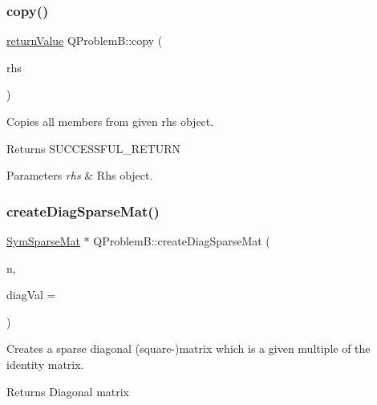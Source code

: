 \subsubsection{\texorpdfstring{copy()}{copy()}}
{\footnotesize\ttfamily \hyperlink{_message_handling_8hpp_a81d556f613bfbabd0b1f9488c0fa865e}{return\+Value} Q\+Problem\+B\+::copy (\begin{DoxyParamCaption}\item[{const \hyperlink{class_q_problem_b}{Q\+ProblemB} \&}]{rhs }\end{DoxyParamCaption})\hspace{0.3cm}{\ttfamily [protected]}}

Copies all members from given rhs object. \begin{DoxyReturn}{Returns}
S\+U\+C\+C\+E\+S\+S\+F\+U\+L\+\_\+\+R\+E\+T\+U\+RN 
\end{DoxyReturn}

\begin{DoxyParams}{Parameters}
{\em rhs} & Rhs object. \\
\hline
\end{DoxyParams}
\mbox{\label{class_q_problem_b_a53fb5975dddabd52e3cbc1062f2faa7d}} 
\subsubsection{\texorpdfstring{create\+Diag\+Sparse\+Mat()}{createDiagSparseMat()}}
{\footnotesize\ttfamily \hyperlink{class_sym_sparse_mat}{Sym\+Sparse\+Mat} $\ast$ Q\+Problem\+B\+::create\+Diag\+Sparse\+Mat (\begin{DoxyParamCaption}\item[{\hyperlink{_types_8hpp_ab6fd6105e64ed14a0c9281326f05e623}{int\+\_\+t}}]{n,  }\item[{\hyperlink{qp_o_a_s_e_s__wrapper_8h_a0d00e2b3dfadee81331bbb39068570c4}{real\+\_\+t}}]{diag\+Val = {} }\end{DoxyParamCaption})\hspace{0.3cm}{\ttfamily [protected]}}

Creates a sparse diagonal (square-\/)matrix which is a given multiple of the identity matrix. \begin{DoxyReturn}{Returns}
Diagonal matrix ~\newline

\end{DoxyReturn}

